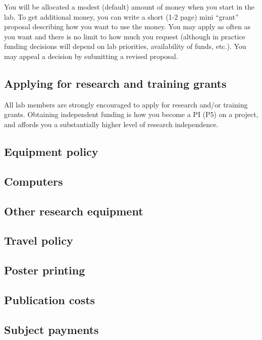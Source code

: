 \documentclass{tufte-book} %
\begin{document}
You will be allocated a modest (default) amount of money when you start
in the lab.  To get additional money, you can write a short (1-2 page)
mini ``grant'' proposal describing how you want to use the money.  You
may apply as often as you want and there is no limit to how much you
request (although in practice funding decisions will depend on lab
priorities, availability of funds, etc.).  You may appeal a decision by
submitting a revised proposal.

 \subsection{Applying for research and training grants}
All lab members are strongly encouraged to apply for research and/or
training grants.  Obtaining independent funding is how you become a PI
(P5) on a project, and affords you a substantially higher level of
research independence.  

 \subsection{Equipment policy}
 \subsection{Computers}
 \subsection{Other research equipment}

 \subsection{Travel policy}

 \subsection{Poster printing}

 \subsection{Publication costs}

 \subsection{Subject payments}
\end{document}
